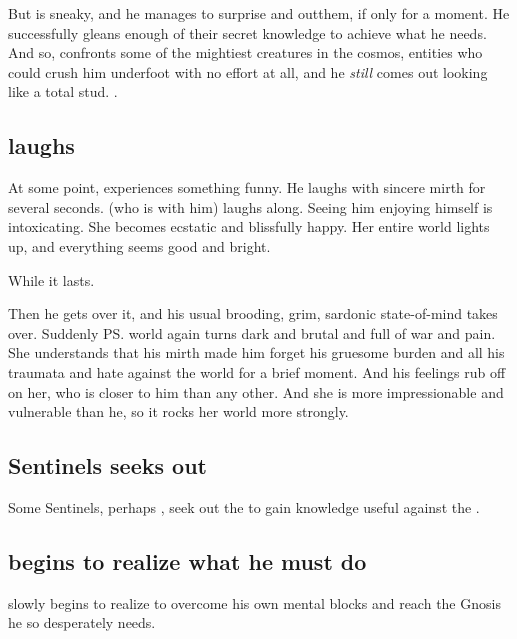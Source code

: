 But \Ishnaruchaefir{} is sneaky, and he manages to surprise and out\manoeuvre them, if only for a moment. He successfully gleans enough of their secret knowledge to achieve what he needs. And so, \Ishnaruchaefir{} confronts some of the mightiest creatures in the cosmos, entities who could crush him underfoot with no effort at all, and he \emph{still} comes out looking like a total stud. .  







\subsection{\Ishnaruchaefir{} laughs}
At some point, \Ishnaruchaefir{} experiences something funny. 
He laughs with sincere mirth for several seconds. 
\Criseis{} (who is with him) laughs along. 
Seeing him enjoying himself is intoxicating. 
She becomes ecstatic and blissfully happy. 
Her entire world lights up, and everything seems good and bright. 

While it lasts. 

Then he gets over it, and his usual brooding, grim, sardonic state-of-mind takes over. 
Suddenly \ps{\Criseis} world again turns dark and brutal and full of war and pain.
She understands that his mirth made him forget his gruesome burden and all his traumata and hate against the world for a brief moment. 
And his feelings rub off on her, who is closer to him than any other. 
And she is more impressionable and vulnerable than he, so it rocks her world more strongly. 





\subsection{Sentinels seeks out \voyagers}
Some Sentinels, perhaps \Ishnaruchaefir, seek out the  to gain knowledge useful against the \banes. 








\subsection{\Ishnaruchaefir{} begins to realize what he must do}
\Ishnaruchaefir{} slowly begins to realize  to overcome his own mental blocks and reach the Gnosis he so desperately needs. 

